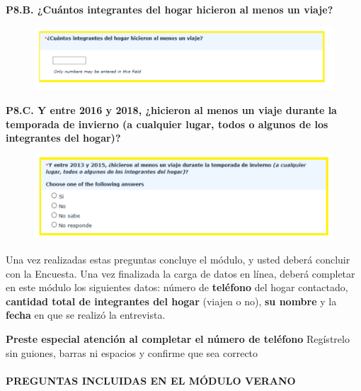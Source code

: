\documentclass[
  openany]{book}
\begin{document}
\textbf{P8.B. ¿Cuántos integrantes del hogar hicieron al menos un viaje?}

\begin{figure}

{\centering \includegraphics[width=1\linewidth]{imagenes/figura6-136} 

}

\end{figure}

\textbf{P8.C. Y entre 2016 y 2018, ¿hicieron al menos un viaje durante la temporada de invierno (a cualquier lugar, todos o algunos de los integrantes del hogar)?}

\begin{figure}

{\centering \includegraphics[width=1\linewidth]{imagenes/figura6-137} 

}

\end{figure}

Una vez realizadas estas preguntas concluye el módulo, y usted deberá concluir con la Encuesta. Una vez finalizada la carga de datos en línea, deberá completar en este módulo los siguientes datos: número de \textbf{teléfono} del hogar contactado, \textbf{cantidad total de integrantes del hogar} (viajen o no), \textbf{su nombre} y la \textbf{fecha} en que se realizó la entrevista.

\textbf{Preste especial atención al completar el número de teléfono} Regístrelo sin guiones, barras ni espacios y confirme que sea correcto

\hypertarget{preguntas-incluidas-en-el-muxf3dulo-verano}{%
\paragraph{\texorpdfstring{\textbf{PREGUNTAS INCLUIDAS EN EL MÓDULO VERANO}}{PREGUNTAS INCLUIDAS EN EL MÓDULO VERANO}}\label{preguntas-incluidas-en-el-muxf3dulo-verano}}
\end{document}
